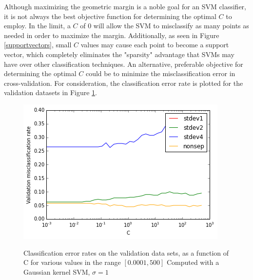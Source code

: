\documentclass[10pt]{article}
\begin{document}
Although maximizing the geometric margin is a noble goal for an SVM classifier, it is not always the best objective function for determining the optimal $C$ to employ.  In the limit, a $C$ of $0$ will allow the SVM to misclassify as many points as needed in order to maximize the margin.  Additionally, as seen in Figure \ref{supportvectors}, small $C$ values may cause each point to become a support vector, which completely eliminates the "sparsity" advantage that SVMs may have over other classification techniques. An alternative, preferable objective for determining the optimal $C$ could be to minimize the misclassification error in cross-validation.  For consideration, the classification error rate is plotted for the validation datasets in Figure \ref{cer_svm}.
\begin{figure}
\centering
\includegraphics[scale=0.5]{cer_svm.png}
\label{cer_svm}
\caption{Classification error rates on the validation data sets, as a function of C for various values in the range $[0.0001, 500]$ Computed with a Gaussian kernel SVM, $\sigma=1$}
\end{figure}
\end{document}
